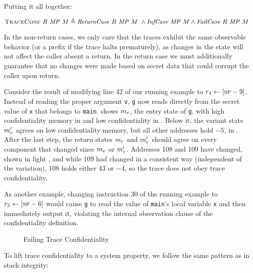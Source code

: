 \documentclass[acmsmall,review,anonymous]{acmart}\settopmatter{printfolios=true,printccs=false,printacmref=false}
\begin{document}
{Putting it all together:

\[  \text{\sc TraceConf} ~ R ~ \mathit{MP} ~ M \triangleq
   \mathit{ReturnCase} ~ R ~ \mathit{MP} ~ M ~ \land
   \mathit{InfCase} ~ \mathit{MP} ~ M \land
    \mathit{FailCase} ~ R ~ \mathit{MP} ~ M
\]

In the non-return cases, we only care that the traces exhibit the same
observable behavior (or a prefix if the trace halts prematurely), as changes
in the state will not affect the caller absent a return.  In the return case
we must additionally guarantee that no changes were made based on secret data
that could corrupt the caller upon return.

Consider the result of modifying line 42 of our running example to $r_4 \leftarrow [\textsc{sp} - 9]$.
Instead of reading the proper argument {\tt v}, {\tt g} now reads directly from the
secret value of {\tt x} that belongs to {\tt main}. 
shows \(m_e\), the entry state of {\tt g}, with high confidentiality memory
in {\high} and low confidentiality in {\low}. Below it, the variant state
\(m_e'\) agrees on low confidentiality memory, but all other addresses
hold $-5$, in {\varied}.  After the last step, the return states \(m_r\) and
\(m_r'\) should agree on every component that changed since \(m_e\) or
\(m_e'\). Addresses 108 and 109 have changed, shown in light {\low}, and while 109
had changed in a consistent way (independent of the variation), 108 holds either 43 or $-4$, so the trace does not obey trace confidentiality.

As another example, changing instruction 30 of the running example to
$r_5 \leftarrow [\textsc{sp} - 6]$ would cause {\tt g} to read the value of
{\tt main}'s local variable {\tt x} and then immediately output it,
violating the internal observation clause of the confidentiality
definition.

\begin{figure}
  \confidentialityendexample
  \caption{Failing Trace Confidentiality}
  \label{fig:confex}
\end{figure}

To lift trace confidentiality to a system property, we follow the same
pattern as in stack integrity:

}
\end{document}
